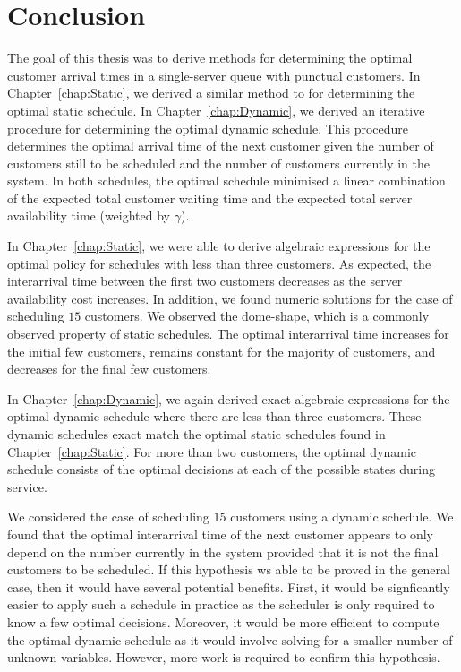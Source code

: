 \chapter{Conclusion}
The goal of this thesis was to derive methods for determining the optimal customer arrival times in a single-server queue with punctual customers. In Chapter~\ref{chap:Static}, we derived a similar method to \citet{Pegden} for determining the optimal static schedule. In Chapter~\ref{chap:Dynamic}, we derived an iterative procedure for determining the optimal dynamic schedule. This procedure determines the optimal arrival time of the next customer given the number of customers still to be scheduled and the number of customers currently in the system. In both schedules, the optimal schedule minimised a linear combination of the expected total customer waiting time and the expected total server availability time (weighted by $\gamma$).

In Chapter~\ref{chap:Static}, we were able to derive algebraic expressions for the optimal policy for schedules with less than three customers. As expected, the interarrival time between the first two customers decreases as the server availability cost increases. In addition, we found numeric solutions for the case of scheduling $15$ customers. We observed the dome-shape, which is a commonly observed property of static schedules. The optimal interarrival time increases for the initial few customers, remains constant for the majority of customers, and decreases for the final few customers.

In Chapter~\ref{chap:Dynamic}, we again derived exact algebraic expressions for the optimal dynamic schedule where there are less than three customers. These dynamic schedules exact match the optimal static schedules found in Chapter~\ref{chap:Static}. For more than two customers, the optimal dynamic schedule consists of the optimal decisions at each of the possible states during service.

We considered the case of scheduling $15$ customers using a dynamic schedule. We found that the optimal interarrival time of the next customer appears to only depend on the number currently in the system provided that it is not the final customers to be scheduled. If this hypothesis ws able to be proved in the general case, then it would have several potential benefits. First, it would be signficantly easier to apply such a schedule in practice as the scheduler is only required to know a few optimal decisions. Moreover, it would be more efficient to compute the optimal dynamic schedule as it would involve solving for a smaller number of unknown variables. However, more work is required to confirm this hypothesis.

